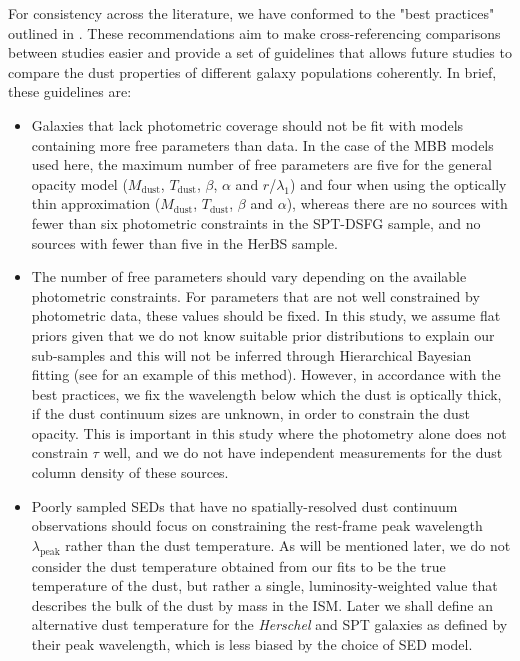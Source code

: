 For consistency across the literature, we have conformed to the "best practices" outlined in \citealt{Drew_2022}. These recommendations aim to make cross-referencing comparisons between studies easier and provide a set of guidelines that allows future studies to compare the dust properties of different galaxy populations coherently. In brief, these guidelines are: 

\begin{itemize}
	\item Galaxies that lack photometric coverage should not be fit with models containing more free parameters than data. In the case of the MBB models used here, the maximum number of free parameters are five for the general opacity model ($M_{\textrm{dust}}$, $T_{\textrm{dust}}$, $\beta$, $\alpha$ and $r$/$\lambda_1$) and four when using the optically thin approximation ($M_{\textrm{dust}}$, $T_{\textrm{dust}}$, $\beta$ and $\alpha$), whereas there are no sources with fewer than six photometric constraints in the SPT-DSFG sample, and no sources with fewer than five in the HerBS sample.
	\item The number of free parameters should vary depending on the available photometric constraints. For parameters that are not well constrained by photometric data, these values should be fixed. In this study, we assume flat priors given that we do not know suitable prior distributions to explain our sub-samples and this will not be inferred through Hierarchical Bayesian fitting (see \citealt{Lamperti_2019} for an example of this method). However, in accordance with the best practices, we fix the wavelength below which the dust is optically thick, if the dust continuum sizes are unknown, in order to constrain the dust opacity. This is important in this study where the photometry alone does not constrain $\tau$ well, and we do not have independent measurements for the dust column density of these sources. 
	\item Poorly sampled SEDs that have no spatially-resolved dust continuum observations should focus on constraining the rest-frame peak wavelength $\lambda_{\textrm{peak}}$ rather than the dust temperature. As will be mentioned later, we do not consider the dust temperature obtained from our fits to be the true temperature of the dust, but rather a single, luminosity-weighted value that describes the bulk of the dust by mass in the ISM. Later we shall define an alternative dust temperature for the \textit{Herschel} and SPT galaxies as defined by their peak wavelength, which is less biased by the choice of SED model.
\end{itemize}

